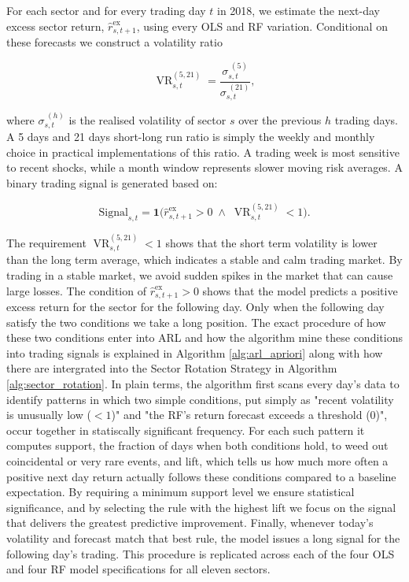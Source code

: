 For each sector and for every trading day $t$ in 2018, we estimate the next-day excess sector return, $\widehat{r}^{\text{ex}}_{s,t+1}$, using every OLS and RF variation. Conditional on these forecasts we construct a volatility ratio

\begin{equation}
\operatorname{VR}_{s,t}^{(5,21)}=\frac{\sigma_{s,t}^{\;(5)}}{\sigma_{s,t}^{\;(21)}},
\end{equation}

where $\sigma_{s,t}^{\;(h)}$ is the realised volatility of sector $s$ over the previous $h$ trading days. A 5 days and 21 days short-long run ratio is simply the weekly and monthly choice in practical implementations of this ratio. A trading week is most sensitive to recent shocks, while a month window represents slower moving risk averages. A binary trading signal is generated based on:

\begin{equation}
\text{Signal}_{s,t}=\mathbf{1}
\!\bigl(
\widehat{r}^{\text{ex}}_{s,t+1}>0
\;\wedge\;
\operatorname{VR}_{s,t}^{(5,21)}<1
\bigr).
\end{equation}

The requirement $\operatorname{VR}_{s,t}^{(5,21)}<1$ shows that the short term volatility is lower than the long term average, which indicates a stable and calm trading market. By trading in a stable market, we avoid sudden spikes in the market that can cause large losses. The condition of $\widehat{r}^{\text{ex}}_{s,t+1}>0$ shows that the model predicts a positive excess return for the sector for the following day. Only when the following day satisfy the two conditions we take a long position.
The exact procedure of how these two conditions enter into ARL and how the algorithm mine these conditions into trading signals is explained in Algorithm \ref{alg:arl_apriori} along with how there are intergrated into the Sector Rotation Strategy in Algorithm \ref{alg:sector_rotation}. In plain terms, the algorithm first scans every day's data to identify patterns in which two simple conditions, put simply as "recent volatility is unusually low ($<1$)" and "the RF's return forecast exceeds a threshold (0)", occur together in statiscally significant frequency. For each such pattern it computes support, the fraction of days when both conditions hold, to weed out coincidental or very rare events, and lift, which tells us how much more often a positive next day return actually follows these conditions compared to a baseline expectation. By requiring a minimum support level we ensure statistical significance, and by selecting the rule with the highest lift we focus on the signal that delivers the greatest predictive improvement. Finally, whenever today's volatility and forecast match that best rule, the model issues a long signal for the following day's trading. This procedure is replicated across each of the four OLS and four RF model specifications for all eleven sectors.

